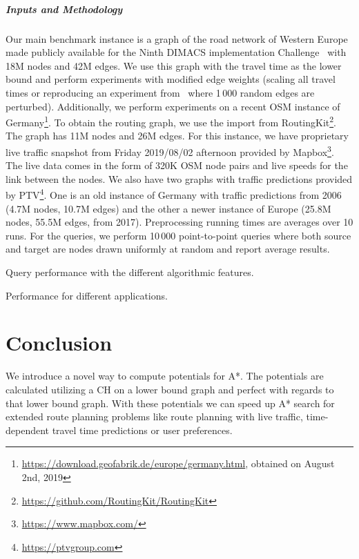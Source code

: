 \documentclass[sigconf]{acmart}
\begin{document}
\subparagraph{Inputs and Methodology}
Our main benchmark instance is a graph of the road network of Western Europe made publicly available for the Ninth DIMACS implementation Challenge~\cite{DemetrescuGJ09} with 18M nodes and 42M edges.
We use this graph with the travel time as the lower bound and perform experiments with modified edge weights (scaling all travel times or reproducing an experiment from~\cite{dw-lbrdg-07} where 1\,000 random edges are perturbed).
Additionally, we perform experiments on a recent OSM instance of Germany\footnote{\url{https://download.geofabrik.de/europe/germany.html}, obtained on August 2nd, 2019}.
To obtain the routing graph, we use the import from RoutingKit\footnote{\url{https://github.com/RoutingKit/RoutingKit}}.
The graph has 11M nodes and 26M edges.
For this instance, we have proprietary live traffic snapshot from Friday 2019/08/02 afternoon provided by Mapbox\footnote{\url{https://www.mapbox.com/}}.
The live data comes in the form of 320K OSM node pairs and live speeds for the link between the nodes.
We also have two graphs with traffic predictions provided by PTV\footnote{\url{https://ptvgroup.com}}.
One is an old instance of Germany with traffic predictions from 2006 (4.7M nodes, 10.7M edges) and the other a newer instance of Europe (25.8M nodes, 55.5M edges, from 2017).
Preprocessing running times are averages over 10 runs.
For the queries, we perform 10\,000 point-to-point queries where both source and target are nodes drawn uniformly at random and report average results.

\begin{table}
\centering
\caption{Query performance with the different algorithmic features.}\label{tab:building_blocks}

\end{table}

\begin{table}
\centering
\caption{Performance for different applications.}\label{tab:applications}

\end{table}

\section{Conclusion}
\label{sec:conclusion}

We introduce a novel way to compute potentials for A*.
The potentials are calculated utilizing a CH on a lower bound graph and perfect with regards to that lower bound graph.
With these potentials we can speed up A* search for extended route planning problems like route planning with live traffic, time-dependent travel time predictions or user preferences.






\end{document}
